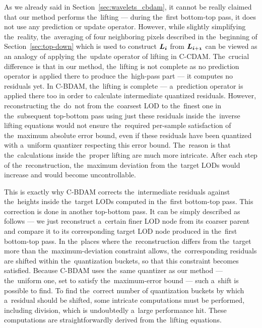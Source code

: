 As we already said in Section~\ref{sec:wavelets_cbdam}, it cannot be really claimed that our method performs the~lifting --- during the~first bottom-top pass, it does not use any prediction or update operator. However, while slightly simplifying the~reality, the~averaging of four neighboring pixels described in the~beginning of Section~\ref{sec:top-down} which is used to construct $\lnorm{i}$ from $\lnorm{i+1}$ can be viewed as an analogy of applying the~update operator of lifting in C-CDAM. The~crucial difference is that in our method, the~lifting is not complete as no prediction operator is applied there to produce the~high-pass part --- it computes no residuals yet. In C-BDAM, the~lifting is complete --- a~prediction operator is applied there too in order to calculate intermediate quantized residuals. However, reconstructing the~do~not from the~coarsest LOD to the~finest one in the~subsequent top-bottom pass using just these residuals inside the~inverse lifting equations would not ensure the~required per-sample satisfaction of the~maximum absolute error bound, even if these residuals have been quantized with a~uniform quantizer respecting this error bound. The~reason is that the~calculations inside the~proper lifting are much more intricate. After each step of the~reconstruction, the~maximum deviation from the~target LODs would increase and would become uncontrollable. 

This is exactly why C-BDAM corrects the~intermediate residuals against the~heights inside the~target LODs computed in the~first bottom-top pass. This correction is done in another top-bottom pass. It can be simply described as follows --- we just reconstruct a~certain finer LOD node from its coarser parent and compare it to its corresponding target LOD node produced in the~first bottom-top pass. In the~places where the~reconstruction differs from the~target more than the~maximum-deviation constraint allows, the~corresponding residuals are shifted within the~quantization buckets, so that this constraint becomes satisfied. Because C-BDAM uses the~same quantizer as our method --- the~uniform one, set to satisfy the~maximum-error bound --- such a~shift is possible to find. To find the~correct number of quantization buckets by which a~residual should be shifted, some intricate computations must be performed, including division, which is undoubtedly a~large performance hit. These computations are straightforwardly derived from the~lifting equations.

